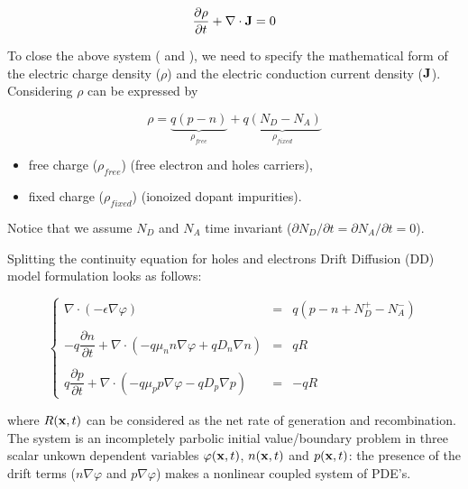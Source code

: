 \begin{equation}
\label{eq: continuity equation total}
\dfrac{\partial \rho}{\partial t} + \nabla \cdot \mathbf{J}  =  0 \end{equation} 




To close the above system ( and  ), we need to specify the mathematical form of the electric charge density ($\rho$) and the electric conduction current density ($\mathbf{J}$).
Considering  $\rho$ can be expressed by 


\begin{equation}
\label{eq: charge balance}
\rho = \underbrace{q(p-n)}_{\rho_{free}} +\underbrace{q(N_D-N_A)}_{\rho_{fixed}}
\end{equation}

\begin{itemize}
\item free charge ($\rho_{free}$) (free electron and holes carriers),
\item fixed charge ($\rho_{fixed}$) (ionoized dopant impurities).
\end{itemize} 


 Notice that we assume $N_D$ and $N_A$ time invariant ($\partial N_D / \partial t=\partial N_A / \partial t = 0$).

 Splitting the continuity equation for holes and electrons Drift Diffusion (DD) model formulation looks as follows:
  
\begin{equation}
\label{eq: full problem}
\left\{
\begin{array}{rcl}
\nabla \cdot (-\epsilon \nabla \varphi) & = & q(p-n+N_D^+-N_A^-)\\ \\
-q\dfrac{\partial n}{\partial t} + \nabla \cdot ( - q\mu_n n \nabla \varphi + qD_n \nabla n )& = & qR\\ \\
q\dfrac{\partial p}{\partial t} + \nabla \cdot (- q\mu_p p \nabla \varphi - qD_p \nabla p )& = & -qR 
\end{array}
\right.
\end{equation}

where $R(\mathbf{x},t)$ can be considered as the net rate of generation and recombination.
The system is an incompletely parbolic initial value/boundary problem in three scalar unkown dependent variables $\varphi(\mathbf{x},t)$, $n(\mathbf{x},t)$ and $p(\mathbf{x},t)$: the presence of the drift terms ($n\nabla \varphi$ and $p \nabla 	\varphi$) makes  a nonlinear coupled system of PDE's. 

